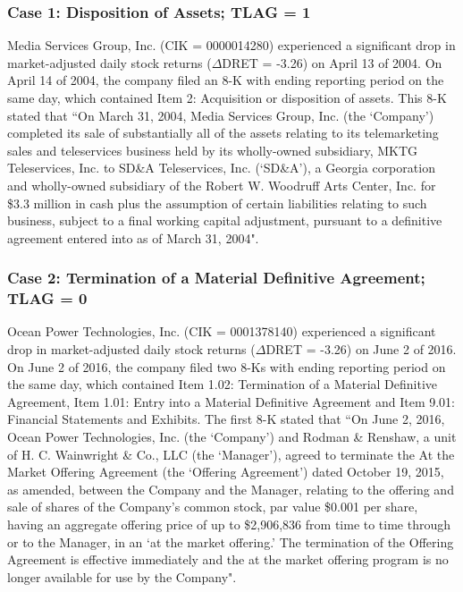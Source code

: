 \subsubsection*{Case 1: Disposition of Assets; TLAG = 1}
Media Services Group, Inc. (CIK = 0000014280) experienced a significant drop in market-adjusted daily stock returns ($\Delta$DRET = -3.26) on April 13 of 2004. On April 14 of 2004, the company filed an 8-K with ending reporting period on the same day, which contained Item 2: Acquisition or disposition of assets. This 8-K stated that ``On March 31, 2004, Media Services Group, Inc. (the `Company') completed its sale of substantially all of the assets relating to its telemarketing sales and teleservices business held by its wholly-owned subsidiary, MKTG Teleservices, Inc. to SD\&A Teleservices, Inc. (`SD\&A'), a Georgia corporation and wholly-owned
subsidiary of the Robert W. Woodruff Arts Center, Inc. for \$3.3 million in cash plus the assumption of certain liabilities relating to such business, subject to
a final working capital adjustment, pursuant to a definitive agreement entered into as of March 31, 2004".
\subsubsection*{Case 2: Termination of a Material Definitive Agreement; TLAG = 0}
Ocean Power Technologies, Inc. (CIK = 0001378140) experienced a significant drop in market-adjusted daily stock returns ($\Delta$DRET = -3.26) on June 2 of 2016. On June 2 of 2016, the company filed two 8-Ks with ending reporting period on the same day, which contained Item 1.02: Termination of a Material Definitive Agreement, Item 1.01: Entry into a Material Definitive Agreement and Item 9.01: Financial Statements and Exhibits. The first 8-K stated that ``On June 2, 2016, Ocean Power Technologies, Inc. (the `Company') and Rodman \& Renshaw, a unit of H. C. Wainwright \& Co., LLC (the `Manager'), agreed to terminate the At the Market Offering Agreement (the `Offering Agreement') dated October 19, 2015, as amended, between the Company and the Manager, relating to the offering and sale of shares of the Company’s common stock, par value \$0.001 per share, having an aggregate offering price of up to \$2,906,836 from time to time through or to the Manager, in an `at the market offering.' The termination of the Offering Agreement is effective immediately and the at the market offering program is no longer available for use by the Company".
